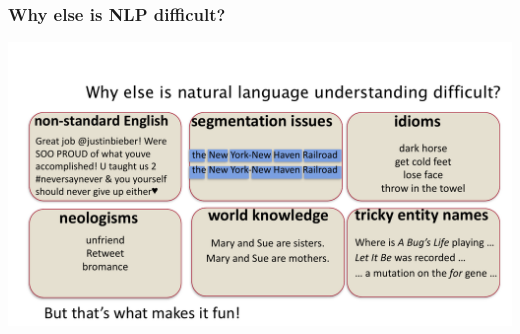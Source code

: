 \documentclass[dvipsnames]{beamer}
\begin{document}
\begin{frame}
\frametitle{Why else is NLP difficult?}
\noindent
\hspace{-0.65cm}
\includegraphics[scale=0.5]{difficulties}
\end{frame}

\end{document}
